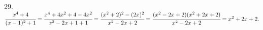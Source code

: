 29. $\cfrac{x^4+4}{(x-1)^2+1}=\cfrac{x^4+4x^2+4-4x^2}{x^2-2x+1+1}=\cfrac{(x^2+2)^2-(2x)^2}{x^2-2x+2}=\cfrac{(x^2-2x+2)(x^2+2x+2)}{x^2-2x+2}=x^2+2x+2.$\\
